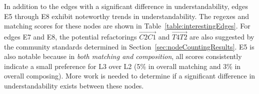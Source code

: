 

In addition to the edges with a significant difference in understandability,  edges E5 through E8 exhibit noteworthy trends in understandability.  The regexes and matching scores for these nodes are shown in Table~\ref{table:interestingEdges}.  For edges E7 and E8, the potential refactorings $\overrightarrow{C2 C1}$ and $\overrightarrow{T4 T2}$ are also suggested by the community standards determined in Section~\ref{sec:nodeCountingResults}.  E5 is also notable because in \emph{both matching and composition}, all scores consistently indicate a small preference for L3 over L2 (5\% in overall matching and 3\% in overall composing).  More work is needed to determine if a significant difference in understandability exists between these nodes.


